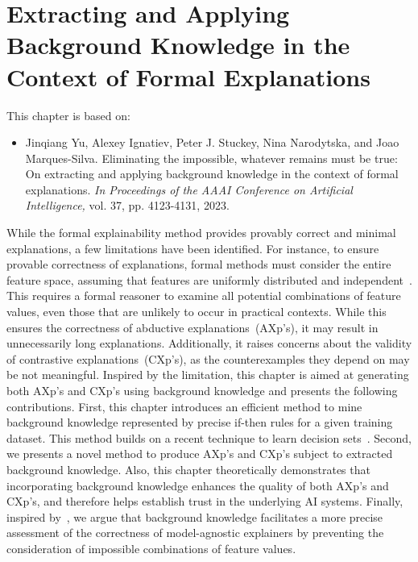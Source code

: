 \chapter{Extracting and Applying Background Knowledge in the Context of Formal Explanations}
\label{chap:aaai23}

This chapter is based on:
\begin{itemize}
	\item Jinqiang Yu, Alexey Ignatiev, Peter J. Stuckey, Nina Narodytska, and Joao Marques-Silva.
Eliminating the impossible, whatever remains must be true: On extracting and applying background
knowledge in the context of formal explanations. \emph{In Proceedings of the AAAI Conference on Artificial
Intelligence,} vol. 37, pp. 4123-4131, 2023.
\end{itemize}

While the formal explainability method provides provably correct and minimal explanations,
a few limitations have been identified.
%
For instance, to ensure provable correctness of explanations, formal methods must consider the entire feature space, 
assuming that features are uniformly distributed and independent~\cite{kutyniok-jair21}.
%
This requires a formal reasoner to examine all potential combinations of feature values, 
even those that are unlikely to occur in practical contexts.
%
While this ensures the correctness of abductive explanations~(AXp's), it may result in unnecessarily
long explanations.
%
Additionally, it raises concerns about the validity of contrastive explanations~(CXp's), 
as the counterexamples they depend on may be not meaningful.
%
Inspired by the limitation, this chapter is aimed at generating both AXp's and CXp's
using background knowledge and presents the following contributions.
%
First, this chapter introduces an efficient method to mine background 
knowledge represented by precise if-then rules for a given training
dataset.
%
This method builds on a recent technique to learn decision 
sets~\cite{ilsms-aaai21}.
%
Second, we presents a novel method to produce AXp's and CXp's subject to extracted background knowledge. 
%
Also, this chapter theoretically demonstrates that incorporating background knowledge 
enhances the quality of both AXp's and CXp's, and therefore helps establish trust in the underlying AI systems.
%
Finally, inspired by~\cite{ignatiev-ijcai20}, we argue that background knowledge 
facilitates a more precise assessment of the correctness of model-agnostic 
explainers by preventing the consideration of impossible combinations of feature values.


%
